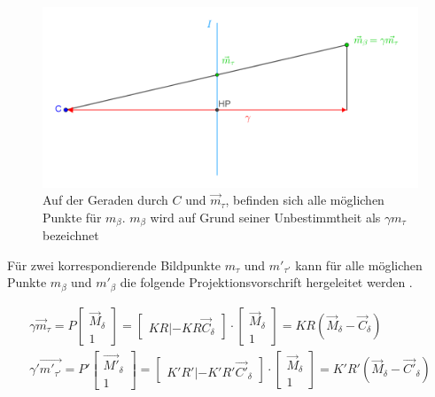 \begin{figure}[!htb]
	\centering
	\includegraphics[width=0.8\linewidth]{images/gamma.png}
	\caption[Veranschaulichung der freien Variablen $\gamma$]{Auf der Geraden durch $C$ und $\overrightarrow{m}_\tau$, befinden sich alle möglichen Punkte für $m_\beta$. $m_\beta$ wird auf Grund seiner Unbestimmtheit als $\gamma m_\tau$ bezeichnet}  
	\label{fig:gamma}
\end{figure}


Für zwei korrespondierende Bildpunkte $m_\tau$ und $ m'_{\tau'}$ kann für alle möglichen Punkte $m_\beta$ und $m'_\beta$ die folgende Projektionsvorschrift hergeleitet werden \cite{Elements}.

\begin{gather}
	\gamma \overrightarrow{m}_\tau = P \begin{bmatrix}\overrightarrow{M}_\delta\\1\end{bmatrix} = 
	\begin{bmatrix}KR|-KR\overrightarrow{C}_\delta\end{bmatrix}\cdot \begin{bmatrix}\overrightarrow{M}_\delta\\1\end{bmatrix} = KR(\overrightarrow{M}_\delta - \overrightarrow{C}_\delta)\\
	\gamma' \overrightarrow{m'_{\tau'}} = P' \begin{bmatrix}\overrightarrow{M'}_\delta\\1\end{bmatrix} = 
	\begin{bmatrix}K'R'|-K'R'\overrightarrow{C'}_\delta\end{bmatrix}\cdot \begin{bmatrix}\overrightarrow{M}_\delta\\1\end{bmatrix} = K'R'(\overrightarrow{M}_\delta - \overrightarrow{C'}_\delta)\label{eq:Homo}
\end{gather}\\


